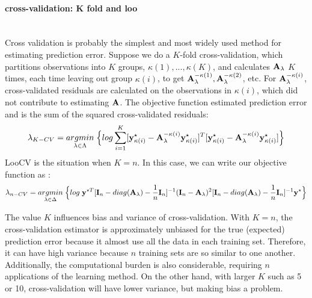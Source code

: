 \documentclass[11pt]{article}
\begin{document}
\paragraph{cross-validation: K fold and loo}\mbox{}\\
Cross validation is probably the simplest and most widely used method for estimating prediction error. Suppose we do a $K$-fold cross-validation, which partitions observations into $K$ groups, $\kappa(1),...,\kappa(K)$, and calculates ${\bf A}_\lambda$ $K$ times, each time leaving out group $\kappa(i)$, to get ${\bf A}_\lambda^{-\kappa(1)}, {\bf A}_\lambda^{-\kappa(2)}$, etc. For ${\bf A}_\lambda^{-\kappa(i)}$, cross-validated residuals are calculated on the observations in $\kappa(i)$, which did not contribute to estimating ${\bf A}$. The objective function estimated prediction error and is the sum of the squared cross-validated residuals:
\begin{align}
\lambda_{K-CV}=\underset{\lambda \in \Lambda}{argmin}\;\Big\{log\sum_{i=1}^K[{\bf y}_{\kappa(i)}^\star-{\bf A}_\lambda^{-\kappa(i)}{\bf y}_{\kappa(i)}^\star]^T[{\bf y}_{\kappa(i)}^\star-{\bf A}_\lambda^{-\kappa(i)}{\bf y}_{\kappa(i)}^\star]\Big\}
\end{align}
LooCV is the situation when $K=n$. In this case, we can write our objective function as \citep{golub_generalized_1979}:
\begin{align}
\lambda_{n-CV}=\underset{\lambda \in \Delta}{argmin}\;\Big\{log\;{\bf y}^{\star T}[{\bf I}_n-diag({\bf A}_\lambda)-\frac{1}{n}{\bf I}_n]^{-1}({\bf I}_n-{\bf A}_\lambda)^2[{\bf I}_n-diag({\bf A}_\lambda)-\frac{1}{n}{\bf I}_n]^{-1}{\bf y}^\star \Big\}
\end{align}

The value $K$ influences bias and variance of cross-validation. With $K=n$, the cross-validation estimator is approximately unbiased for the true (expected) prediction error because it almost use all the data in each training set. Therefore, it can have high variance because $n$ training sets are so similar to one another. Additionally, the computational burden is also considerable, requiring $n$ applications of the learning method. On the other hand, with larger $K$ such as 5 \citep{hastie_elements_2009} or 10, cross-validation will have lower variance, but making bias a problem.
\end{document}
